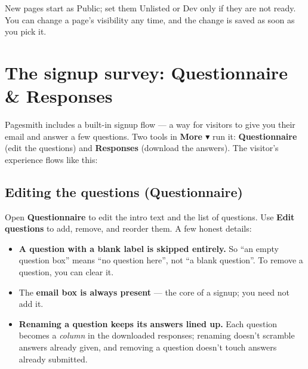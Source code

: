 \documentclass[11pt]{article}
\begin{document}
New pages start as Public; set them Unlisted or Dev only if they are not ready. You
can change a page's visibility any time, and the change is saved as soon as you pick
it.

\section{The signup survey: Questionnaire \& Responses}

Pagesmith includes a built-in signup flow --- a way for visitors to give you their
email and answer a few questions. Two tools in \textbf{More $\blacktriangledown$} run it:
\textbf{Questionnaire} (edit the questions) and \textbf{Responses} (download the
answers). The visitor's experience flows like this:

\begin{center}
\end{center}

\subsection{Editing the questions (Questionnaire)}

Open \textbf{Questionnaire} to edit the intro text and the list of questions. Use
\textbf{Edit questions} to add, remove, and reorder them. A few honest details:

\begin{itemize}[leftmargin=*]
  \item \textbf{A question with a blank label is skipped entirely.} So ``an empty
    question box'' means ``no question here'', not ``a blank question''. To remove a
    question, you can clear it.
  \item The \textbf{email box is always present} --- the core of a signup; you need not
    add it.
  \item \textbf{Renaming a question keeps its answers lined up.} Each question becomes
    a \emph{column} in the downloaded responses; renaming doesn't scramble answers
    already given, and removing a question doesn't touch answers already submitted.
\end{itemize}
\end{document}
